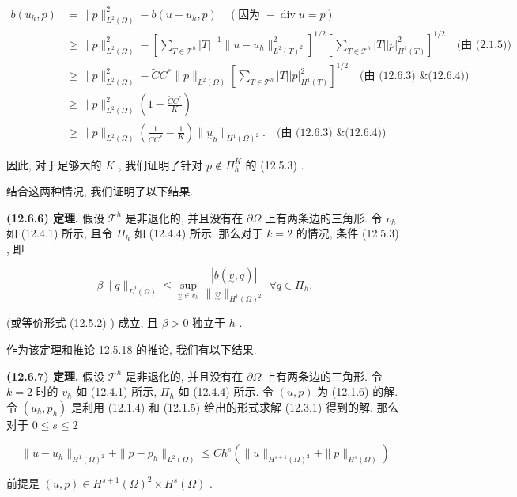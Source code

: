 \begin{align*}
b(u_{h},p) &= \|p\|_{L^{2}(\Omega)}^{2} - b(u - u_{h},p) \quad (\text{因为 } -\operatorname{div}u = p) \\
&\geq \|p\|_{L^{2}(\Omega)}^{2} - \left[ \sum_{T \in \mathcal{T}^{h}} |T|^{-1} \|u - u_{h}\|_{L^{2}(T)^{2}}^{2} \right]^{1/2} \left[ \sum_{T \in \mathcal{T}^{h}} |T| |p|_{H^{1}(T)}^{2} \right]^{1/2} \quad \text{(由 (2.1.5))} \\
&\geq \|p\|_{L^{2}(\Omega)}^{2} - \widetilde{C}C^{*} \|p\|_{L^{2}(\Omega)} \left[ \sum_{T \in \mathcal{T}^{h}} |T| |p|_{H^{1}(T)}^{2} \right]^{1/2} \quad \text{(由 (12.6.3) \& (12.6.4))} \\
&\geq \|p\|_{L^{2}(\Omega)}^{2} \left( 1 - \frac{\widetilde{C}C^{*}}{K} \right) \\
&\geq \|p\|_{L^{2}(\Omega)} \left( \frac{1}{\widetilde{C}C^{*}} - \frac{1}{K} \right) \|\underset{\sim}{u}_{h}\|_{H^{1}(\Omega)^{2}}. \quad \text{(由 (12.6.3) \& (12.6.4))}
\end{align*}

因此, 对于足够大的 $K$ , 我们证明了针对 $p \notin \varPi_{h}^{K}$ 的 (12.5.3) .

结合这两种情况, 我们证明了以下结果.

\textbf{(12.6.6) 定理.} 假设 $\mathcal{T}^{h}$ 是非退化的, 并且没有在 $\partial \Omega$ 上有两条边的三角形. 令 $v_{h}$ 如 (12.4.1) 所示, 且令 $\varPi_{h}$ 如 (12.4.4) 所示. 那么对于 $k = 2$ 的情况, 条件 (12.5.3) , 即

$$
\beta \|q\|_{L^{2}(\Omega)} \leq \sup_{\underset{\sim}{v} \in v_{h}} \frac{|b(\underset{\sim}{v},q)|}{\|\underset{\sim}{v}\|_{H^{1}(\Omega)^{2}}} \;\forall q \in \varPi_{h},
$$

(或等价形式 (12.5.2) ) 成立, 且 $\beta > 0$ 独立于 $h$ .

作为该定理和推论 12.5.18 的推论, 我们有以下结果.

\textbf{(12.6.7) 定理.} 假设 $\mathcal{T}^{h}$ 是非退化的, 并且没有在 $\partial \Omega$ 上有两条边的三角形. 令 $k = 2$ 时的 $v_{h}$ 如 (12.4.1) 所示, $\varPi_{h}$ 如 (12.4.4) 所示. 令 $(u,p)$ 为 (12.1.6) 的解. 令 $(u_{h},p_{h})$ 是利用 (12.1.4) 和 (12.1.5) 给出的形式求解 (12.3.1) 得到的解. 那么对于 $0 \leq s \leq 2$ 

$$
\|u - u_{h}\|_{H^{1}(\Omega)^{2}} + \|p - p_{h}\|_{L^{2}(\Omega)} \leq C h^{s} \left( \|u\|_{H^{s + 1}(\Omega)^{2}} + \|p\|_{H^{s}(\Omega)} \right)
$$

前提是 $(u,p) \in H^{s + 1}(\Omega)^{2} \times H^{s}(\Omega)$ .

